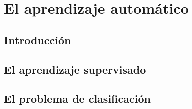 \chapter{El aprendizaje automático}

\section{Introducción}

\section{El aprendizaje supervisado}

\section{El problema de clasificación}